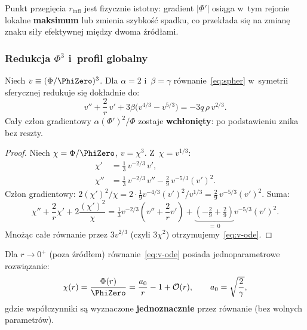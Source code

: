 Punkt przegi\k{e}cia $r_{\mathrm{infl}}$ jest fizycznie istotny:
gradient $|\Phi'|$ osi\k{a}ga w~tym rejonie lokalne
\textbf{maksimum} lub zmienia szybko\'s\'c spadku, co przek\l{}ada
si\k{e} na zmian\k{e} znaku si\l{}y efektywnej mi\k{e}dzy dwoma \'zr\'od\l{}ami.

\subsubsection{Redukcja $\Phi^3$ i~profil globalny}%
\label{ssec:profil-Phi3}

\begin{proposition}[Redukcja $\Phi^3$ --- \'sci\'sla dla $\alpha=2$]%
\label{prop:Phi3-reduction}
Niech $v \equiv (\Phi/\PhiZero)^3$. Dla $\alpha = 2$ i~$\beta = \gamma$
r\'ownanie~\eqref{eq:spher} w~symetrii sferycznej redukuje si\k{e}
dok\l{}adnie do:
\begin{equation}\label{eq:v-ode}
  \boxed{
    v'' + \frac{2}{r}\,v' + 3\beta\bigl(v^{4/3} - v^{5/3}\bigr)
    = -3q\,\rho\,v^{2/3}.
  }
\end{equation}
Ca\l{}y cz\l{}on gradientowy $\alpha(\Phi')^2/\Phi$ zostaje
\textbf{wch\l{}oni\k{e}ty}: po podstawieniu znika bez reszty.
\end{proposition}

\begin{proof}
Niech $\chi = \Phi/\PhiZero$, $v = \chi^3$.
Z~$\chi = v^{1/3}$:
\begin{align*}
  \chi' &= \tfrac{1}{3}\,v^{-2/3}\,v', \\
  \chi'' &= \tfrac{1}{3}\,v^{-2/3}\,v'' - \tfrac{2}{9}\,v^{-5/3}(v')^2.
\end{align*}
Cz\l{}on gradientowy:
$2(\chi')^2/\chi = 2\cdot\tfrac{1}{9}v^{-4/3}(v')^2/v^{1/3}
= \tfrac{2}{9}\,v^{-5/3}(v')^2$.
Suma:
\[
  \chi'' + \frac{2}{r}\chi' + 2\frac{(\chi')^2}{\chi}
  = \tfrac{1}{3}v^{-2/3}\!\left(v'' + \frac{2}{r}v'\right)
  + \underbrace{\left(-\tfrac{2}{9}+\tfrac{2}{9}\right)}_{=\,0}v^{-5/3}(v')^2.
\]
Mnożąc ca\l{}e r\'ownanie przez $3v^{2/3}$ (czyli $3\chi^2$)
otrzymujemy~\eqref{eq:v-ode}.
\end{proof}

\begin{proposition}%
\label{prop:near-field-series}
Dla $r \to 0^+$ (poza \'zr\'od\l{}em) r\'ownanie~\eqref{eq:v-ode}
posiada jednoparametrowe rozwi\k{a}zanie:
\begin{equation}\label{eq:chi-near}
  \chi(r) = \frac{\Phi(r)}{\PhiZero}
  = \frac{a_0}{r} - 1 + \mathcal{O}(r),
  \qquad
  a_0 = \sqrt{\frac{2}{\gamma}},
\end{equation}
gdzie wsp\'o\l{}czynniki s\k{a} wyznaczone \textbf{jednoznacznie}
przez r\'ownanie (bez wolnych parametr\'ow).
\end{proposition}

